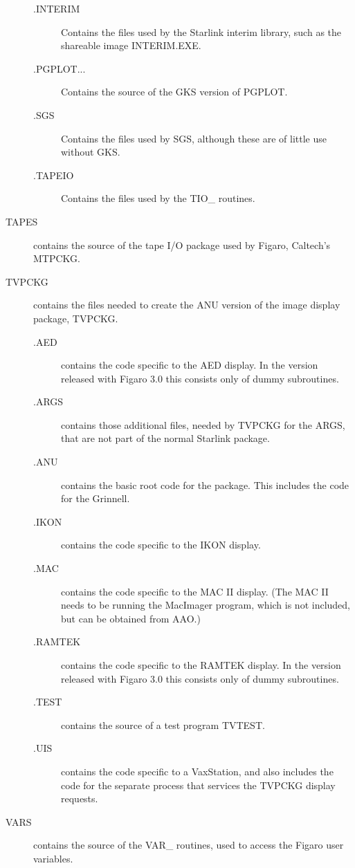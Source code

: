 \begin{description}
\begin{description}
\item [.INTERIM] Contains the files used by the Starlink interim library,
such as the shareable image INTERIM.EXE.

\item [.PGPLOT...] Contains the source of the GKS version of PGPLOT.

\item [.SGS] Contains the files used by SGS, although these are of little
use without GKS.

\item [.TAPEIO] Contains the files used by the TIO\_ routines.

\end {description}

\item [TAPES] contains the source of the tape I/O package used by Figaro,
Caltech's MTPCKG.

\item [TVPCKG] contains the files needed to create the ANU version of the
image display package, TVPCKG.

\begin{description}

\item [.AED] contains the code specific to the AED display. In the
version released with Figaro 3.0 this consists only of dummy subroutines.

\item [.ARGS] contains those additional files, needed by TVPCKG for the ARGS,
that are not part of the normal Starlink package.

\item [.ANU] contains the basic root code for the package. This
includes the code for the Grinnell.

\item [.IKON] contains the code specific to the IKON display.

\item [.MAC] contains the code specific to the MAC II display. (The MAC
II needs to be running the MacImager program, which is not included, but
can be obtained from AAO.)

\item [.RAMTEK] contains the code specific to the RAMTEK display. In the
version released with Figaro 3.0 this consists only of dummy subroutines.

\item [.TEST] contains the source of a test program TVTEST.

\item [.UIS] contains the code specific to a VaxStation, and also includes
the code for the separate process that services the TVPCKG display requests.

\end{description}

\item [VARS] contains the source of the VAR\_ routines, used to access the
Figaro user variables.

\end{description}

